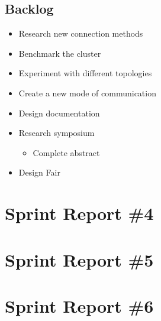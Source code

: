 \subsection*{Backlog}
\begin{itemize}
	\item Research new connection methods
	\item Benchmark the cluster
	\item Experiment with different topologies
	\item Create a new mode of communication
	\item Design documentation
	\item Research symposium
	\begin{itemize}
		\item Complete abstract
	\end{itemize}
	\item Design Fair
\end{itemize}

\section{Sprint Report \#4}

\section{Sprint Report \#5}

\section{Sprint Report \#6}

